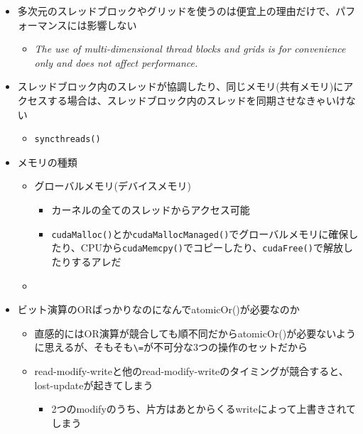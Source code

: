 \documentclass[12pt,a4paper,uplatex]{jsarticle}
\begin{document}
\begin{itemize}
  \begin{itemize}
    \item 複数次元のスレッドは以下のスレッドIDの計算式でliniarizedされて、その連続した32スレッドがwarpを構成する
    \begin{align}
      \text{linear id} = x+yN_x+zN_xN_y
    \end{align}
  \end{itemize}
  \item 多次元のスレッドブロックやグリッドを使うのは便宜上の理由だけで、パフォーマンスには影響しない
  \begin{itemize}
    \item \textit{The use of multi-dimensional thread blocks and grids is for convenience only and does not affect performance.}
  \end{itemize}
  \item スレッドブロック内のスレッドが協調したり、同じメモリ(共有メモリ)にアクセスする場合は、スレッドブロック内のスレッドを同期させなきゃいけない
  \begin{itemize}
    \item \lstinline|syncthreads()|
  \end{itemize}
  \item メモリの種類
  \begin{itemize}
    \item グローバルメモリ(デバイスメモリ)
    \begin{itemize}
      \item カーネルの全てのスレッドからアクセス可能
      \item \lstinline|cudaMalloc()|とか\lstinline|cudaMallocManaged()|でグローバルメモリに確保したり、CPUから\lstinline|cudaMemcpy()|でコピーしたり、\lstinline|cudaFree()|で解放したりするアレだ
    \end{itemize}
    \item 
  \end{itemize}
    \item ビット演算のORばっかりなのになんでatomicOr()が必要なのか
  \begin{itemize}
    \item 直感的にはOR演算が競合しても順不同だからatomicOr()が必要ないように思えるが、そもそも\lstinline|\=|が不可分な3つの操作のセットだから
    \item read-modify-writeと他のread-modify-writeのタイミングが競合すると、lost-updateが起きてしまう
    \begin{itemize}
      \item 2つのmodifyのうち、片方はあとからくるwriteによって上書きされてしまう

\end{itemize}
\end{itemize}
\end{itemize}
\end{document}
